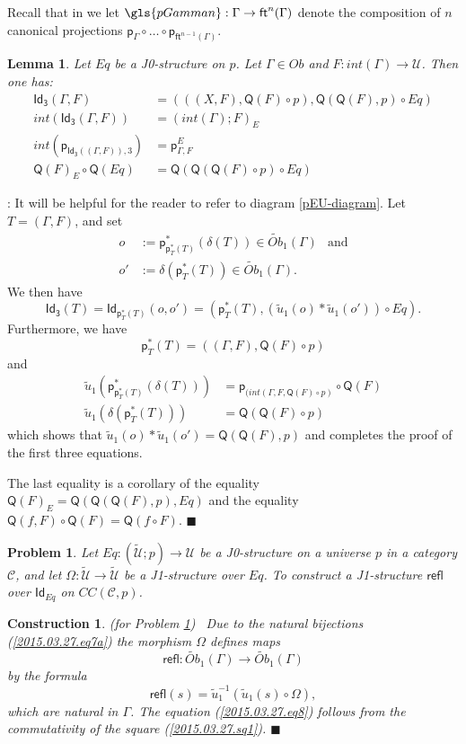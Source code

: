 \documentclass[12pt]{article}
\numberwithin{equation}{section}
\newenvironment{eq}{\begin{equation}}{\end{equation}}
\newenvironment{myproof}{{\bf Proof}:}{$\blacksquare$ \vskip 5mm }
\newtheorem{lemma}[proposition]{Lemma}
\newtheorem{problem}[proposition]{Problem}
\newtheorem{construction0}[proposition]{Construction}
\newenvironment{construction}[1]{\begin{construction0}(for Problem \ref{#1})\ }{$\blacksquare$ \end{construction0}}
\newcommand{\sr}{\rightarrow}
\newcommand{\wt}{\widetilde}
\newcommand{\toCC}{CC} %
\newcommand{\C}{{\mathcal C}}  %
\newcommand{\ft}{\mathsf{ft}}
\newcommand{\p}{\mathsf{p}}
\newcommand{\Id}{\mathsf{Id}} %
\newcommand{\Idx}{\mathsf{Id_3}} %
\newcommand{\refl}{\mathsf{refl}}
\newcommand{\U}{\mathcal{U}}
\newcommand{\Q}{\mathsf{Q}}
\newcommand{\Obwt}{\wt{Ob}}
\begin{document}
%
Recall that in \cite{Csubsystems} we let $\gls{pGamman}:\Gamma\sr \ft^n(\Gamma)$
denote the composition of $n$ canonical projections $\p_{\Gamma}\circ \dots\circ
\p_{\ft^{n-1}(\Gamma)}$.
%
\begin{lemma}
\label{2015.03.27.l1} Let $Eq$ be a J0-structure on $p$. Let $\Gamma\in Ob$
and $F:int(\Gamma)\sr \U$. Then one has:
%
\begin{align}
  \Idx(\Gamma,F) &= (((X,F),\Q(F)\circ p), \Q(\Q(F),p)\circ Eq) \label{2015.03.27.l1-IDx} \\
  int(\Idx(\Gamma,F))&=(int(\Gamma);F)_{E} \\
  int(\p_{\Idx((\Gamma,F)),3}) &= \p^E_{\Gamma,F} \\
  \Q(F)_{E}\circ \Q(Eq)&=\Q(\Q(\Q(F)\circ p)\circ Eq)
\end{align}
%
%
\end{lemma}
%
\begin{myproof}
It will be helpful for the reader to refer to diagram \ref{pEU-diagram}.
Let $T=(\Gamma,F)$, and set
\begin{align*}
  o &:=\p_{\p_T^*(T)}^*(\delta(T)) \in \Obwt_1(\Gamma) & \text{and}\\
  o'&:=\delta(\p_T^*(T)) \in \Obwt_1(\Gamma) .
\end{align*}
We then have
%
$$\Idx(T)=\Id_{\p_T^*(T)}(o,o')= (\p_T^*(T), (\wt{u}_1(o)*\wt{u}_1(o')) \circ Eq).$$
%
%
%
Furthermore, we have
%
$$\p_T^*(T) =((\Gamma,F),\Q(F)\circ p)$$
%
and
%
\begin{align*}
  \wt{u}_1(\p_{\p_T^*(T)}^*(\delta(T)))&=\p_{(int(\Gamma,F, \Q(F)\circ p)}\circ \Q(F) \\
  \wt{u}_1(\delta(\p_T^*(T)))&=\Q(\Q(F)\circ p)
\end{align*}
%
which shows that $\wt{u}_1(o)*\wt{u}_1(o')=\Q(\Q(F),p)$ and completes the proof
of the first three equations.

The last equality is a corollary of the equality $\Q(F)_{E}=\Q(\Q(\Q(F),p),Eq)$
and the equality $\Q(f,F)\circ \Q(F)=\Q(f\circ F)$.
\end{myproof}
%
\begin{problem}
\label{2015.03.27.prob4} Let $Eq:(\wt{\U};p)\sr \U$
be a J0-structure on a universe $p$ in a category $\C$,
and let $\Omega:\wt{\U}\sr \wt{\U}$ be a J1-structure over $Eq$.
To construct a J1-structure $\refl$ over $\Id_{Eq}$ on $\toCC({\C},p)$.
\end{problem}
%
\begin{construction}{2015.03.27.prob4}\rm
\label{2015.03.27.constr4} Due to the natural bijections
(\ref{2015.03.27.eq7a}) the morphism $\Omega$ defines maps
%
$$\refl:\Obwt_1(\Gamma)\sr \Obwt_1(\Gamma)$$
%
by the formula
%
\begin{eq}
  \label{refl-defn}
  \refl(s)=\wt{u}_1^{-1}(\wt{u}_1(s)\circ \Omega),
\end{eq}%
which are natural in $\Gamma$. The equation (\ref{2015.03.27.eq8}) follows from
the commutativity of the square (\ref{2015.03.27.sq1}).
\end{construction}
\end{document}
